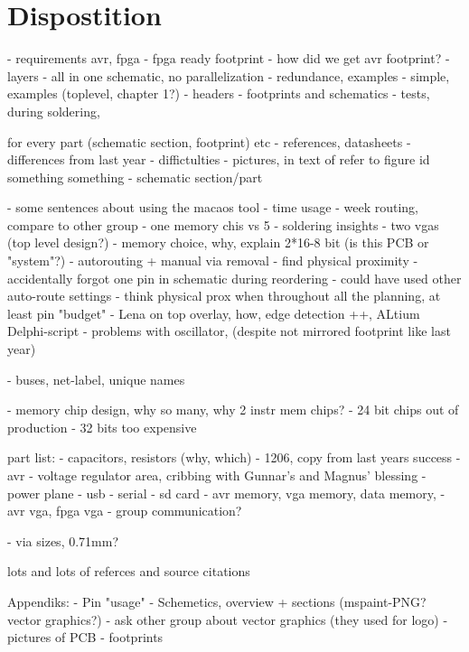 \section {Dispostition}
- requirements avr, fpga
- fpga ready footprint
- how did we get avr footprint?
- layers
- all in one schematic, no parallelization
- redundance, examples
- simple, examples (toplevel, chapter 1?)
- headers
- footprints and schematics
- tests, during soldering,

for every part (schematic section, footprint) etc
    - references, datasheets
    - differences from last year
    - diffictulties
    - pictures, in text of refer to figure id something something
    - schematic section/part

    - some sentences about using the macaos tool
    - time usage
    - week routing, compare to other group
    - one memory chis vs 5
    - soldering insights
    - two vgas (top level design?)
    - memory choice, why, explain 2*16-8 bit (is this PCB or "system"?)
    - autorouting + manual via removal
    - find physical proximity
    - accidentally forgot one pin in schematic during reordering
    - could have used other auto-route settings
    - think physical prox when throughout all the planning, at least pin "budget"
    - Lena on top overlay, how, edge detection ++, ALtium Delphi-script
    - problems with oscillator, (despite not mirrored footprint like last year)

    - buses, net-label, unique names

    - memory chip design, why so many, why 2 instr mem chips?
    - 24 bit chips out of production
    - 32 bits too expensive


    part list:
    - capacitors, resistors (why, which)
    - 1206, copy from last years success
    - avr
    - voltage regulator area, cribbing with Gunnar's and Magnus' blessing
    - power plane
    - usb
    - serial
    - sd card
    - avr memory, vga memory, data memory,
    - avr vga, fpga vga
    - group communication?

    - via sizes, 0.71mm?

    lots and lots of referces and source citations


    Appendiks:
    - Pin "usage"
    - Schemetics, overview + sections (mspaint-PNG? vector graphics?)
    - ask other group about vector graphics (they used for logo)
        - pictures of PCB
        - footprints



